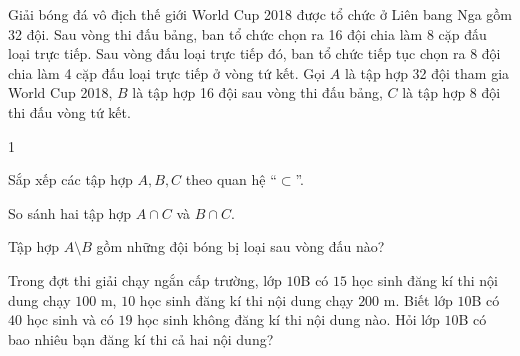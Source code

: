 \begin{bt}%
	Giải bóng đá vô địch thế giới World Cup 2018 được tổ chức ở Liên bang Nga gồm 32 đội. Sau vòng thi đấu bảng, ban tổ chức chọn ra 16 đội chia làm 8 cặp đấu loại trực tiếp. Sau vòng đấu loại trực tiếp đó, ban tổ chức tiếp tục chọn ra 8 đội chia làm 4 cặp đấu loại trực tiếp ở vòng tứ kết. Gọi $A$ là tập hợp 32 đội tham gia World Cup 2018, $B$ là tập hợp 16 đội sau vòng thi đấu bảng, $C$ là tập hợp 8 đội thi đấu vòng tứ kết.
	\begin{enumEX}[a)]{1}	
		\item Sắp xếp các tập hợp $A, B, C$ theo quan hệ ``$\subset$''.
		\item So sánh hai tập hợp $A \cap C$ và $B \cap C$.
		\item Tập hợp $A \setminus B$ gồm những đội bóng bị loại sau vòng đấu nào?
	\end{enumEX}
\end{bt}

\begin{bt}%
	Trong đợt thi giải chạy ngắn cấp trường, lớp $10$B có $15$ học sinh đăng kí thi nội dung chạy $100$ m, $10$ học sinh đăng kí thi nội dung chạy $200$ m. Biết lớp $10$B có $40$ học sinh và có $19$ học sinh không đăng kí thi nội dung nào. Hỏi lớp $10$B có bao nhiêu bạn đăng kí thi cả hai nội dung?
\end{bt}

